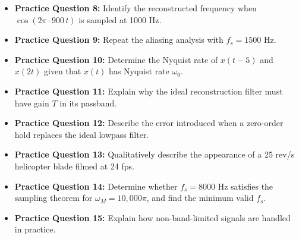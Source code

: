 \documentclass[11pt]{article}
\begin{document}
\begin{itemize}
  \item \textbf{Practice Question 8:} Identify the reconstructed frequency when $\cos(2\pi \cdot 900\,t)$ is sampled at 1000 Hz.
  \item \textbf{Practice Question 9:} Repeat the aliasing analysis with $f_s = 1500$ Hz.
  \item \textbf{Practice Question 10:} Determine the Nyquist rate of $x(t-5)$ and $x(2t)$ given that $x(t)$ has Nyquist rate $\omega_0$.
  \item \textbf{Practice Question 11:} Explain why the ideal reconstruction filter must have gain $T$ in its passband.
  \item \textbf{Practice Question 12:} Describe the error introduced when a zero-order hold replaces the ideal lowpass filter.
  \item \textbf{Practice Question 13:} Qualitatively describe the appearance of a 25 rev/s helicopter blade filmed at 24 fps.
  \item \textbf{Practice Question 14:} Determine whether $f_s = 8000$ Hz satisfies the sampling theorem for $\omega_M = 10{,}000\pi$, and find the minimum valid $f_s$.
  \item \textbf{Practice Question 15:} Explain how non-band-limited signals are handled in practice.
\end{itemize}
\end{document}
